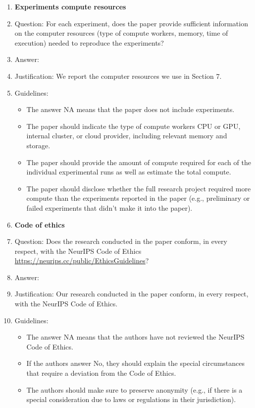 \documentclass{article}
\theoremstyle{remark}
\begin{document}
\begin{enumerate}
\item {\bf Experiments compute resources}
    \item[] Question: For each experiment, does the paper provide sufficient information on the computer resources (type of compute workers, memory, time of execution) needed to reproduce the experiments?
    \item[] Answer: \answerYes{} %
    \item[] Justification: We report the computer resources we use in Section 7.
    \item[] Guidelines:
    \begin{itemize}
        \item The answer NA means that the paper does not include experiments.
        \item The paper should indicate the type of compute workers CPU or GPU, internal cluster, or cloud provider, including relevant memory and storage.
        \item The paper should provide the amount of compute required for each of the individual experimental runs as well as estimate the total compute. 
        \item The paper should disclose whether the full research project required more compute than the experiments reported in the paper (e.g., preliminary or failed experiments that didn't make it into the paper). 
    \end{itemize}
    
\item {\bf Code of ethics}
    \item[] Question: Does the research conducted in the paper conform, in every respect, with the NeurIPS Code of Ethics \url{https://neurips.cc/public/EthicsGuidelines}?
    \item[] Answer: \answerYes{} %
    \item[] Justification: Our research conducted in the paper conform, in every respect, with the NeurIPS Code of Ethics.
    \item[] Guidelines:
    \begin{itemize}
        \item The answer NA means that the authors have not reviewed the NeurIPS Code of Ethics.
        \item If the authors answer No, they should explain the special circumstances that require a deviation from the Code of Ethics.
        \item The authors should make sure to preserve anonymity (e.g., if there is a special consideration due to laws or regulations in their jurisdiction).
    \end{itemize}



\end{enumerate}
\end{document}
